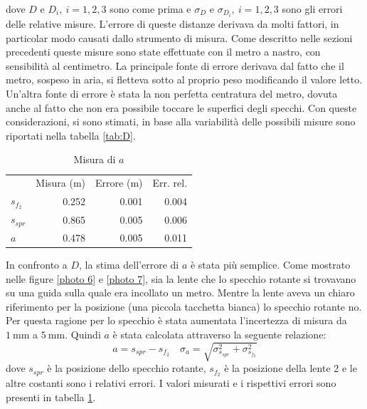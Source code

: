 \documentclass[a4paper,11pt]{article}
\begin{document}
	dove $ D $ e $ D_i, \ i=1,2,3 $ sono come prima e $ \sigma_D $ e $ \sigma_{D_i}, \ i=1,2,3 $ sono gli errori delle relative misure. L'errore di queste distanze derivava da molti fattori, in particolar modo causati dallo strumento di misura. Come descritto nelle sezioni precedenti queste misure sono state effettuate con il metro a nastro, con sensibilità al centimetro. La principale fonte di errore derivava dal fatto che il metro, sospeso in aria, si fletteva sotto al proprio peso modificando il valore letto. Un'altra fonte di errore è stata la non perfetta centratura del metro, dovuta anche al fatto che non era possibile toccare le superfici degli specchi.
	Con queste considerazioni, si sono stimati, in base alla variabilità delle possibili misure sono riportati nella tabella \ref{tab:D}.
	
	\begin{table}
		\vspace{-0.5cm}
		\centering
		\caption{Misura di $ a $}
		\vspace{0.1cm}
		\begin{tabular}{lrrr}
			\rowcolor[rgb]{ .741,  .843,  .933}       & \multicolumn{1}{l}{Misura (\si{\meter})} & \multicolumn{1}{l}{Errore (\si{\meter})} & \multicolumn{1}{l}{Err. rel.} \\
			\rowcolor[rgb]{ .741,  .843,  .933} $s_{f_2}$ & \cellcolor[rgb]{ .859,  .859,  .859} 0.252 & \cellcolor[rgb]{ .859,  .859,  .859} 0.001 & \cellcolor[rgb]{ .859,  .859,  .859} 0.004 \\
			\rowcolor[rgb]{ .741,  .843,  .933} $s_{spr}$ & \cellcolor[rgb]{ .929,  .929,  .929} 0.865 & \cellcolor[rgb]{ .929,  .929,  .929} 0.005 & \cellcolor[rgb]{ .929,  .929,  .929} 0.006 \\
			\rowcolor[rgb]{ .741,  .843,  .933} $a$   & \cellcolor[rgb]{ .859,  .859,  .859} 0.478 & \cellcolor[rgb]{ .859,  .859,  .859} 0.005 & \cellcolor[rgb]{ .859,  .859,  .859} 0.011 \\
		\end{tabular}%
		\label{tab:a}%
	\end{table}%
	
	
	In confronto a $ D $, la stima dell'errore di $ a $ è stata più semplice. Come mostrato nelle figure \ref{photo 6} e \ref{photo 7}, sia la lente che lo specchio rotante si trovavano su una guida sulla quale era incollato un metro. Mentre la lente aveva un chiaro riferimento per la posizione (una piccola tacchetta bianca) lo specchio rotante no. Per questa ragione per lo specchio è stata aumentata l'incertezza di misura da $ \SI{1}{\milli\meter} $ a $ \SI{5}{\milli\meter} $. Quindi $ a $ è stata calcolata attraverso la seguente relazione:
	\begin{equation}\label{eqn:a}
	a = s_{spr} - s_{f_2} \quad \sigma_a = \sqrt{ \sigma_{s_{spr}}^2+\sigma_{s_{f_2}}^2}
	\end{equation}
	dove $ s_{spr} $ è la posizione dello specchio rotante, $ s_{f_2} $ è la posizione della lente 2 e le altre costanti sono i relativi errori. I valori misurati e i rispettivi errori sono presenti in tabella \ref{tab:a}.
	
\end{document}
